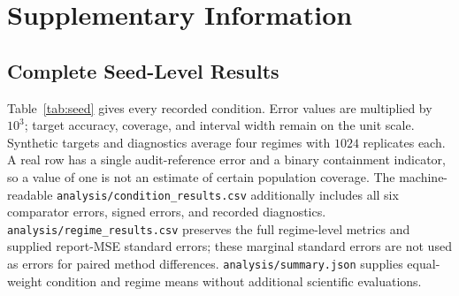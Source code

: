 \documentclass{article}
\begin{document}
\clearpage



\clearpage
\appendix
\section{Supplementary Information}
\subsection{Complete Seed-Level Results}
Table~\ref{tab:seed} gives every recorded condition. Error values are multiplied by $10^3$; target accuracy, coverage, and interval width remain on the unit scale. Synthetic targets and diagnostics average four regimes with $1024$ replicates each. A real row has a single audit-reference error and a binary containment indicator, so a value of one is not an estimate of certain population coverage. The machine-readable \texttt{analysis/condition\_results.csv} additionally includes all six comparator errors, signed errors, and recorded diagnostics. \texttt{analysis/regime\_results.csv} preserves the full regime-level metrics and supplied report-MSE standard errors; these marginal standard errors are not used as errors for paired method differences. \texttt{analysis/summary.json} supplies equal-weight condition and regime means without additional scientific evaluations.
\end{document}
